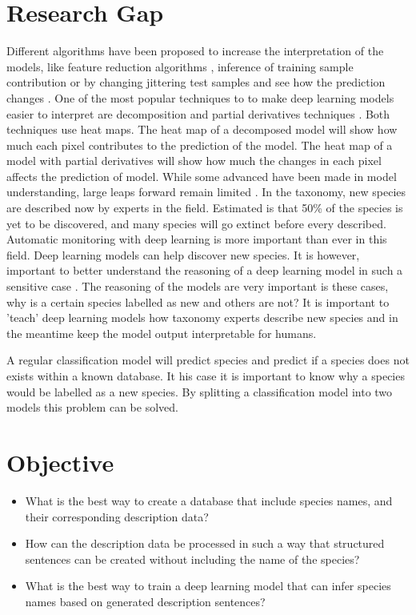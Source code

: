 \documentclass{article}
\begin{document}
\section{Research Gap}
Different algorithms have been proposed to increase the interpretation of the models, like feature reduction algorithms \cite{ribeiro_why_2016}, inference of training sample contribution \cite{koh_understanding_2020} or by changing jittering test samples and see how the prediction changes \cite{li_understanding_2017}.
One of the most popular techniques to to make deep learning models easier to interpret are decomposition and partial derivatives techniques \cite{samek_explainable_2017}.
Both techniques use heat maps.
The heat map of a decomposed model will show how much each pixel contributes to the prediction of the model.
The heat map of a model with partial derivatives will show how much the changes in each pixel affects the prediction of model.
While some advanced have been made in model understanding, large leaps forward remain limited \cite{lipton_mythos_2017, li_interpretable_2021}.
In the taxonomy, new species are described now by experts in the field.
Estimated is that 50\% of the species is yet to be discovered, and many species will go extinct before every described.
Automatic monitoring with deep learning is more important than ever in this field.
Deep learning models can help discover new species.
It is however, important to better understand the reasoning of a deep learning model in such a sensitive case \cite{carvalho_machine_2019}.
The reasoning of the models are very important is these cases, why is a certain species labelled as new and others are not?
It is important to 'teach' deep learning models how taxonomy experts describe new species and in the meantime keep the model output interpretable for humans.

A regular classification model will predict species and predict if a species does not exists within a known database.
It his case it is important to know why a species would be labelled as a new species.
By splitting a classification model into two models this problem can be solved.




\section{Objective}

\begin{itemize}
    \item What is the best way to create a database that include species names, and their corresponding description data?
    \item How can the description data be processed in such a way that structured sentences can be created without including the name of the species?
    \item What is the best way to train a deep learning model that can infer species names based on generated description sentences?
\end{itemize}
\end{document}
